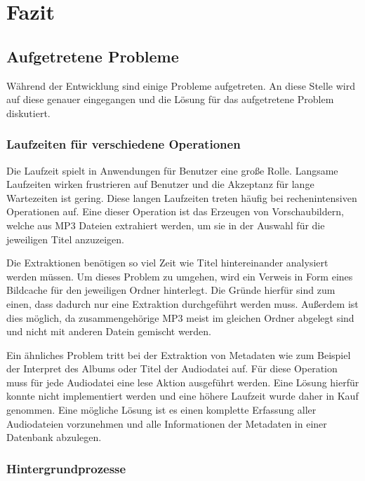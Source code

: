 \section{Fazit}

\subsection{Aufgetretene Probleme}

Während der Entwicklung sind einige Probleme aufgetreten. An diese Stelle wird auf diese genauer eingegangen und die Lösung für das aufgetretene Problem diskutiert.

\subsubsection{Laufzeiten für verschiedene Operationen}

Die Laufzeit spielt in Anwendungen für Benutzer eine große Rolle. Langsame Laufzeiten wirken frustrieren auf Benutzer und die Akzeptanz für lange Wartezeiten ist gering. Diese langen Laufzeiten treten häufig bei rechenintensiven Operationen auf. Eine dieser Operation ist das Erzeugen von Vorschaubildern, welche aus MP3 Dateien extrahiert werden, um sie in der Auswahl für die jeweiligen Titel anzuzeigen.

Die Extraktionen benötigen so viel Zeit wie Titel hintereinander analysiert werden müssen. Um dieses Problem zu umgehen, wird ein Verweis in Form eines Bildcache für den jeweiligen Ordner hinterlegt. Die Gründe hierfür sind zum einen, dass dadurch nur eine Extraktion durchgeführt werden muss. Außerdem ist dies möglich, da zusammengehörige MP3 meist im gleichen Ordner abgelegt sind und nicht mit anderen Datein gemischt werden.

Ein ähnliches Problem tritt bei der Extraktion von Metadaten wie zum Beispiel der Interpret des Albums oder Titel der Audiodatei auf. Für diese Operation muss für jede Audiodatei eine lese Aktion ausgeführt werden. Eine Lösung hierfür konnte nicht implementiert werden und eine höhere Laufzeit wurde daher in Kauf genommen. Eine mögliche Lösung ist es einen komplette Erfassung aller Audiodateien vorzunehmen und alle Informationen der Metadaten in einer Datenbank abzulegen.

\subsubsection{Hintergrundprozesse}

